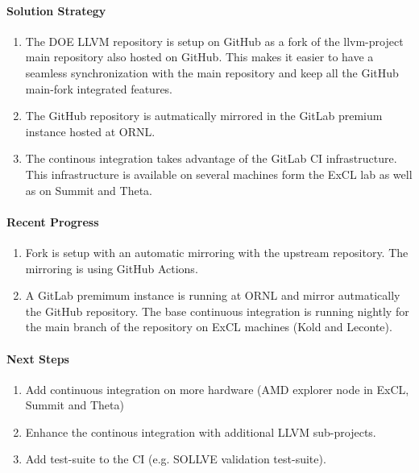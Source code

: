 \paragraph{Solution Strategy}

\begin{enumerate}

\item The DOE LLVM repository is setup on GitHub as a fork of the llvm-project
      main repository also hosted on GitHub. This makes it easier to have a
      seamless synchronization with the main repository and keep all the
      GitHub main-fork integrated features.

\item The GitHub repository is autmatically mirrored in the GitLab premium
      instance hosted at ORNL.

\item The continous integration takes advantage of the GitLab CI infrastructure.
      This infrastructure is available on several machines form the ExCL lab as
      well as on Summit and Theta.

\end{enumerate}


\paragraph{Recent Progress}

\begin{enumerate}
\item Fork is setup with an automatic mirroring with the upstream repository.
      The mirroring is using GitHub Actions.

\item A GitLab premimum instance is running at ORNL and mirror autmatically the
      GitHub repository. The base continuous integration is running nightly
      for the main branch of the repository on ExCL machines (Kold and Leconte).
\end{enumerate}


\paragraph{Next Steps}

\begin{enumerate}
\item Add continuous integration on more hardware (AMD explorer node in ExCL,
      Summit and Theta)
\item Enhance the continous integration with additional LLVM sub-projects.
\item Add test-suite to the CI (e.g. SOLLVE validation test-suite).
\end{enumerate}
